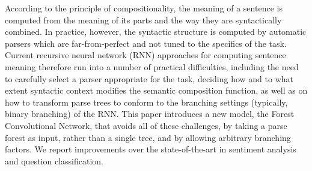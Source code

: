 According to the principle of compositionality, the meaning of a sentence is computed from the meaning of its parts and the way they are syntactically combined. In practice, however, the syntactic structure is computed by automatic parsers which are far-from-perfect and not tuned to the specifics of the task. Current recursive neural network (RNN) approaches for computing sentence meaning therefore run into a number of practical difficulties, including the need to carefully select a parser appropriate for the task, deciding how and to what extent syntactic context modifies the semantic composition function, as well as on how to transform parse trees to conform to the branching settings (typically, binary branching) of the RNN. This paper introduces a new model, the Forest Convolutional Network, that avoids all of these challenges, by taking a parse forest as input, rather than a single tree, and by allowing arbitrary branching factors. We report improvements over the state-of-the-art in sentiment analysis and question classification.
